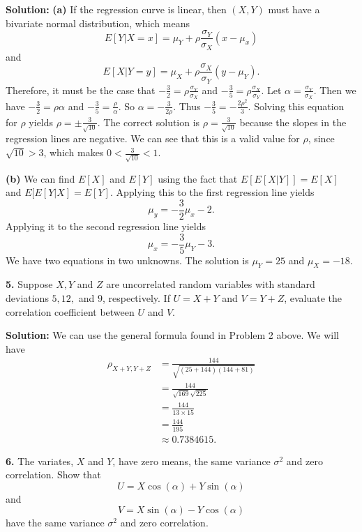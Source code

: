 \documentclass{article}
\newcommand{\mybox}{%
    \collectbox{%
        \setlength{\fboxsep}{1pt}%
        \fbox{\BOXCONTENT}%
    }%
}
\begin{document}
\noindent\mybox{\textbf{Solution:}}  \textbf{(a)}  If the regression curve is linear, then $(X,Y)$ must have a bivariate normal distribution, which means $$E[Y|X=x] = \mu_Y + \rho\frac{\sigma_Y}{\sigma_X}(x-\mu_x)$$ and $$E[X|Y=y] = \mu_X + \rho\frac{\sigma_X}{\sigma_Y}(y-\mu_Y).$$  Therefore, it must be the case that $-\frac{3}{2} = \rho\frac{\sigma_Y}{\sigma_X}$ and $-\frac{3}{5} = \rho\frac{\sigma_X}{\sigma_Y}.$  Let $\alpha = \frac{\sigma_Y}{\sigma_X}$.  Then we have $-\frac{3}{2} =\rho\alpha$ and $-\frac{3}{5} = \frac{\rho}{\alpha}$.  So $\alpha = -\frac{3}{2\rho}$.  Thus $-\frac{3}{5} = -\frac{2\rho^2}{3}$.  Solving this equation for $\rho$ yields $\rho = \pm\frac{3}{\sqrt{10}}$.  The correct solution is $\rho = \frac{3}{\sqrt{10}}$ because the slopes in the regression lines are negative.  We can see that this is a valid value for $\rho$, since $\sqrt{10} > 3$, which makes $0 < \frac{3}{\sqrt{10}} < 1$.

\vspace{3mm}

\noindent\textbf{(b)}  We can find $E[X]$ and $E[Y]$ using the fact that $E[E[X|Y]] = E[X]$ and $E[E[Y|X] = E[Y]$.  Applying this to the first regression line yields $$\mu_y = -\frac{3}{2}\mu_x - 2.$$  Applying it to the second regression line yields $$\mu_x = -\frac{3}{5}\mu_Y-3.$$  We have two equations in two unknowns.  The solution is $\mu_Y = 25$ and $\mu_X = -18$.  

\pagebreak

\noindent\mybox{\textbf{5.}}  Suppose $X,Y$ and $Z$ are uncorrelated random variables with standard deviations $5,12,$ and $9$, respectively.  If $U=X+Y$ and $V=Y+Z$, evaluate the correlation coefficient between $U$ and $V$.  

\vspace{5mm}

\noindent\mybox{\textbf{Solution:}}  We can use the general formula found in Problem 2 above.  We will have
\begin{align}
\rho_{X+Y,Y+Z} &= \frac{144}{\sqrt{(25+144)(144+81)}} \\
&= \frac{144}{\sqrt{169}\sqrt{225}} \\
&= \frac{144}{13\times 15} \\
&= \frac{144}{195} \\
&\approx 0.7384615.  
\end{align}

\pagebreak

\noindent\mybox{\textbf{6.}}  The variates, $X$ and $Y$, have zero means, the same variance $\sigma^2$ and zero correlation.  Show that $$U=X\cos(\alpha) +Y\sin(\alpha)$$ and $$V=X\sin(\alpha)-Y\cos(\alpha)$$ have the same variance $\sigma^2$ and zero correlation.
\end{document}

